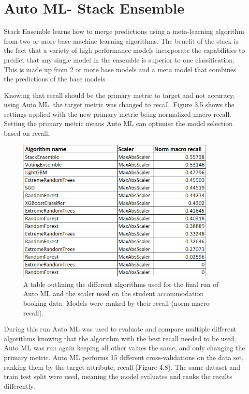 \section{Auto ML- Stack Ensemble}
Stack Ensemble learns how to merge predictions using a meta-learning algorithm from two or more base machine learning algorithms. The benefit of the stack is the fact that a variety of high performance models incorporate the capabilities to predict that any single model in the ensemble is superior to one classification. This is made up from 2 or more base models and a meta model that combines the predictions of the base models.

\vspace{5mm}

Knowing that recall should be the primary metric to target and not accuracy, using Auto ML, the target metric was changed to recall. Figure 3.5 shows the settings applied with the new primary metric being normalized macro recall. Setting the primary metric means Auto ML can optimise the model selection based on recall.

 \begin{figure}[H]
 \centering
\includegraphics[width=10cm]{figures/auto_ml_final_models.png}
 \caption{A table outlining the different algorithms used for the final run of Auto ML and the scaler used on the student accommodation booking data. Models were ranked by their recall (norm macro recall).}
\end{figure}

During this run Auto ML was used to evaluate and compare multiple different algorithms knowing that the algorithm with the best recall needed to be used, Auto ML was run again keeping all other values the same, and only changing the primary metric. Auto ML performs 15 different cross-validations on the data set, ranking them by the target attribute, recall (Figure 4.8). The same dataset and train test split were used,  meaning the model evaluates and ranks the results differently.

